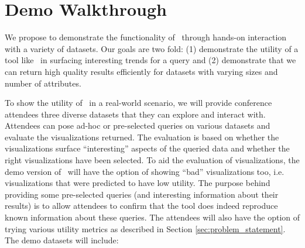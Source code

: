 
\section{Demo Walkthrough}
\label{demo-walkthrough}
 
We propose to demonstrate the functionality of \SeeDB\ through hands-on
interaction with a variety of datasets. Our goals are two fold: (1) demonstrate
the utility of a tool like \SeeDB\ in surfacing interesting trends for a query
and (2) demonstrate that we can return high quality results efficiently for
datasets with varying sizes and number of attributes.

 To show the utility of \SeeDB\ in a real-world
scenario, we will provide conference attendees three diverse datasets that they
can explore and interact with. Attendees can pose ad-hoc or pre-selected queries
on various datasets and evaluate the visualizations returned. The
evaluation is based on whether the visualizations surface ``interesting''
aspects of the queried data and whether the right visualizations have been
selected. To aid the evaluation of visualizations, the demo version of \SeeDB\
will have the option of showing ``bad'' visualizations too, i.e. visualizations
that were predicted to have low utility. The purpose behind providing some
pre-selected queries (and interesting information about their results) is to
allow attendees to confirm that the tool does indeed reproduce known
information about these queries. The attendees will also have the option of
trying various utility metrics as described in Section
\ref{sec:problem_statement}. The demo datasets will include:
 
